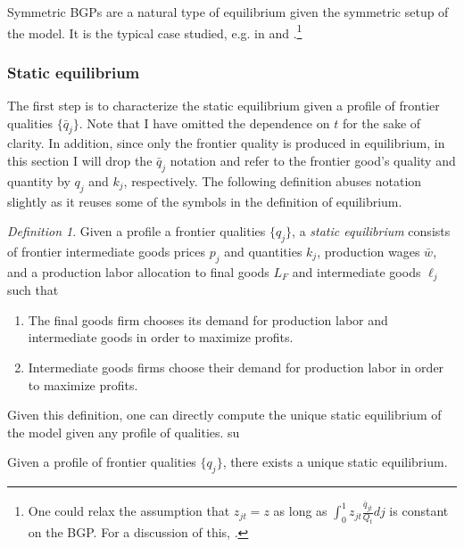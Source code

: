 \documentclass[ecta,nameyear,final]{econsocart}
\theoremstyle{plain}
\theoremstyle{remark}
\newtheorem{definition}[theorem]{Definition}
\begin{document}
Symmetric BGPs are a natural type of equilibrium given the symmetric setup of the model. It is the typical case studied, e.g. in \cite{grossman_quality_1991} and \cite{acemoglu_innovation_2015}.\footnote{One could relax the assumption that $z_{jt} = z$ as long as $\int_0^1 z_{jt} \frac{\bar{q}_{jt}}{Q_t}dj$ is constant on the BGP. For a discussion of this, \cite{acemoglu_introduction_2009}.} 

\subsubsection{Static equilibrium}

The first step is to characterize the static equilibrium given a profile of frontier qualities $\{ \bar{q}_{j}\}$. Note that I have omitted the dependence on $t$ for the sake of clarity. In addition, since only the frontier quality is produced in equilibrium, in this section I will drop the $\bar{q}_{j}$ notation and refer to the frontier good's quality and quantity by $q_j$ and $k_j$, respectively. The following definition abuses notation slightly as it reuses some of the symbols in the definition of equilibrium. 


\theoremstyle{definition}
\begin{definition}
	Given a profile a frontier qualities $\{q_{j}\}$, a \emph{static equilibrium} consists of frontier intermediate goods prices $p_j$ and quantities $k_j$, production wages $\bar{w}$, and a production labor allocation to final goods $L_{F}$ and intermediate goods $\ell_j$ such that
	\begin{enumerate}
		\item The final goods firm chooses its demand for production labor and intermediate goods in order to maximize profits.
		\item Intermediate goods firms choose their demand for production labor in order to maximize profits.
	\end{enumerate}
\end{definition}

Given this definition, one can directly compute the unique static equilibrium of the model given any profile of qualities. su

\begin{proposition}\label{proposition:static_equilibrium_existence_uniqueness}
	Given a profile of frontier qualities $\{q_j\}$, there exists a unique static equilibrium.
\end{proposition}
\end{document}
